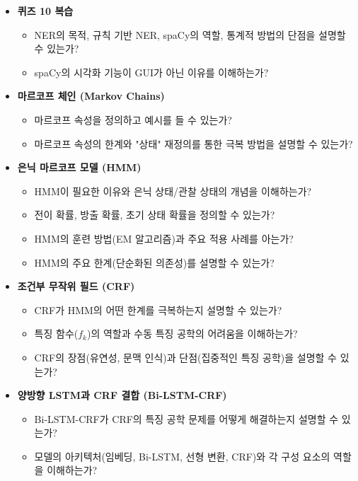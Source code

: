 \documentclass[11pt,a4paper]{article}
\theoremstyle{definition}
\begin{document}
\begin{tcolorbox}[summarybox, title=학습 점검 체크리스트]
\begin{itemize}
    \item \textbf{퀴즈 10 복습}
    \begin{itemize}
        \item NER의 목적, 규칙 기반 NER, spaCy의 역할, 통계적 방법의 단점을 설명할 수 있는가?
        \item spaCy의 시각화 기능이 GUI가 아닌 이유를 이해하는가?
    \end{itemize}
    \item \textbf{마르코프 체인 (Markov Chains)}
    \begin{itemize}
        \item 마르코프 속성을 정의하고 예시를 들 수 있는가?
        \item 마르코프 속성의 한계와 "상태" 재정의를 통한 극복 방법을 설명할 수 있는가?
    \end{itemize}
    \item \textbf{은닉 마르코프 모델 (HMM)}
    \begin{itemize}
        \item HMM이 필요한 이유와 은닉 상태/관찰 상태의 개념을 이해하는가?
        \item 전이 확률, 방출 확률, 초기 상태 확률을 정의할 수 있는가?
        \item HMM의 훈련 방법(EM 알고리즘)과 주요 적용 사례를 아는가?
        \item HMM의 주요 한계(단순화된 의존성)를 설명할 수 있는가?
    \end{itemize}
    \item \textbf{조건부 무작위 필드 (CRF)}
    \begin{itemize}
        \item CRF가 HMM의 어떤 한계를 극복하는지 설명할 수 있는가?
        \item 특징 함수($f_k$)의 역할과 수동 특징 공학의 어려움을 이해하는가?
        \item CRF의 장점(유연성, 문맥 인식)과 단점(집중적인 특징 공학)을 설명할 수 있는가?
    \end{itemize}
    \item \textbf{양방향 LSTM과 CRF 결합 (Bi-LSTM-CRF)}
    \begin{itemize}
        \item Bi-LSTM-CRF가 CRF의 특징 공학 문제를 어떻게 해결하는지 설명할 수 있는가?
        \item 모델의 아키텍처(임베딩, Bi-LSTM, 선형 변환, CRF)와 각 구성 요소의 역할을 이해하는가?

\end{itemize}
\end{itemize}
\end{tcolorbox}
\end{document}
